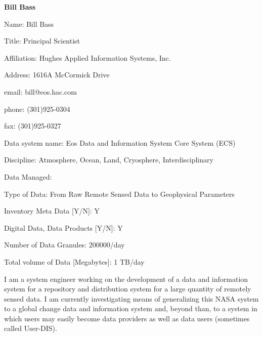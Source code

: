 \begin{center}
\LARGE
{\bf  Bill Bass}
\end{center}
\bigskip
\large
{}
\normalsize
\smallskip
\begin{description}

\item{Name:}  Bill Bass
\item{Title:}  Principal Scientist
\item{Affiliation:}  Hughes Applied Information Systems, Inc.
\item{Address:}  1616A McCormick Drive
\item{email:}  bill@eos.hac.com
\item{phone:}  (301)925-0304
\item{fax:}  (301)925-0327
\end{description}
\medskip
\large
{}
\normalsize
\medskip
\begin{description}

\item{Data system name:}  Eos Data and Information System Core System 
(ECS)
\item{Discipline:}  Atmosphere, Ocean, Land, Cryosphere, Interdisciplinary
\item{Data Managed:}
	\begin{description}
	\item{Type of Data:}  From Raw Remote Sensed Data to Geophysical 
Parameters
	\item{Inventory Meta Data [Y/N]:}  Y
	\item{Digital Data, Data Products [Y/N]:}  Y
	\item{Number of Data Granules:}  200000/day
	\item{Total volume of Data [Megabytes]:}  1 TB/day
	\end{description}
\end{description}

\medskip
\large
{}
\normalsize
\medskip

	I am a system engineer working on the development of a data and 
information system for a repository and distribution system for a large 
quantity of remotely sensed data.  I am currently investigating means of 
generalizing this NASA system to a global change data and information 
system and, beyond than, to a system in which users may easily become 
data providers as well as data users (sometimes called User-DIS).
\newpage

